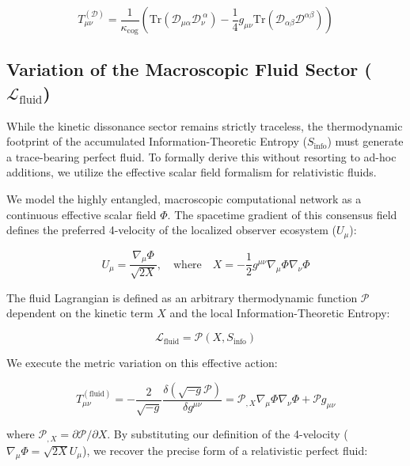 \documentclass[12pt,openany]{book}
\theoremstyle{plain}
\theoremstyle{definition}
\theoremstyle{remark}
\begin{document}
\begin{equation}
T_{\mu\nu}^{(\mathcal{D})} = \frac{1}{\kappa_{\text{cog}}} \left( \text{Tr}(\mathcal{D}_{\mu\alpha} \mathcal{D}_{\nu}^{\ \alpha}) - \frac{1}{4} g_{\mu\nu} \text{Tr}(\mathcal{D}_{\alpha\beta} \mathcal{D}^{\alpha\beta}) \right)
\end{equation}

\subsection{Variation of the Macroscopic Fluid Sector ($\mathcal{L}_{\text{fluid}}$)}

While the kinetic dissonance sector remains strictly traceless, the thermodynamic footprint of the accumulated Information-Theoretic Entropy ($S_{\text{info}}$) must generate a trace-bearing perfect fluid. To formally derive this without resorting to ad-hoc additions, we utilize the effective scalar field formalism for relativistic fluids.

We model the highly entangled, macroscopic computational network as a continuous effective scalar field $\Phi$. The spacetime gradient of this consensus field defines the preferred 4-velocity of the localized observer ecosystem ($U_\mu$):

\begin{equation}
U_\mu = \frac{\nabla_\mu \Phi}{\sqrt{2X}}, \quad \text{where} \quad X = -\frac{1}{2}g^{\mu\nu}\nabla_\mu \Phi \nabla_\nu \Phi
\end{equation}

The fluid Lagrangian is defined as an arbitrary thermodynamic function $\mathcal{P}$ dependent on the kinetic term $X$ and the local Information-Theoretic Entropy:

\begin{equation}
\mathcal{L}_{\text{fluid}} = \mathcal{P}(X, S_{\text{info}})
\end{equation}

We execute the metric variation on this effective action:

\begin{equation}
T_{\mu\nu}^{(\text{fluid})} = -\frac{2}{\sqrt{-g}} \frac{\delta(\sqrt{-g}\mathcal{P})}{\delta g^{\mu\nu}} = \mathcal{P}_{,X} \nabla_\mu \Phi \nabla_\nu \Phi + \mathcal{P} g_{\mu\nu}
\end{equation}

where $\mathcal{P}_{,X} = \partial \mathcal{P} / \partial X$. By substituting our definition of the 4-velocity ($\nabla_\mu \Phi = \sqrt{2X} U_\mu$), we recover the precise form of a relativistic perfect fluid:
\end{document}
